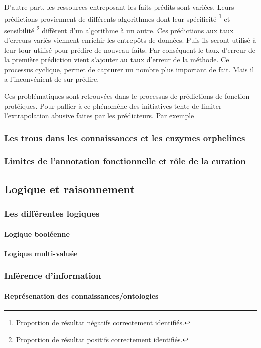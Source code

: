 \begin{refsegment}
    D’autre part, les ressources entreposant les faits prédits sont variées. Leurs prédictions proviennent  de différents algorithmes dont leur spécificité \footnote{Proportion de résultat négatifs correctement identifiés.} et sensibilité \footnote{Proportion de résultat positifs correctement identifiés.} diffèrent d’un algorithme à un autre. Ces prédictions aux taux d’erreurs variés viennent enrichir les entrepôts de données. Puis ils seront utilisé à leur tour utilisé pour prédire de nouveau faits. Par conséquent  le taux d’erreur de la première prédiction vient s’ajouter au taux d’erreur de la méthode. Ce processus cyclique, permet de capturer un nombre plus important de fait. Mais il a l’inconvénient de sur-prédire.
    
    Ces problématiques sont retrouvées dans le processus de prédictions de fonction protéiques.
    Pour pallier à ce phénomène des initiatives tente de limiter l’extrapolation abusive faites par les prédicteurs. Par exemple \citeauthor{pfeiffer2015manual}
    
    
    \subsubsection{Les trous dans les connaissances et les enzymes orphelines}
    \subsubsection{Limites de l’annotation fonctionnelle et rôle de la curation}
    \subsection{Logique et raisonnement}
    \subsubsection{Les différentes logiques}
    \paragraph{Logique booléenne}
    \paragraph{Logique multi-valuée}
    \subsubsection{Inférence d’information}
    \paragraph{Représenation des connaissances/ontologies}

\end{refsegment}
